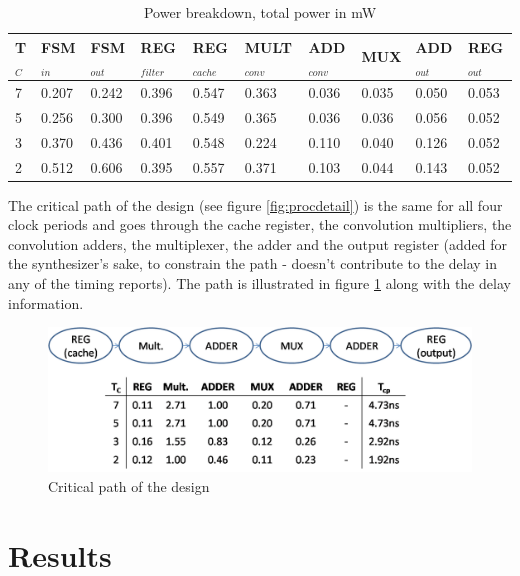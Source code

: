 \documentclass[11pt,a4paper]{article}
\begin{document}
\begin{table}
	\caption{Power breakdown, total power in mW}
	\begin{center}
		\begin{tabular}{|p{0.4cm}|p{1.15cm}|p{1.25cm}|p{1.5cm}|p{1.55cm}|p{1.75cm}|p{1.45cm}|p{1cm}|p{1.3cm}|p{1.25cm}|} \hline
			\textbf{T}$_{C}$ & \textbf{FSM}$_{in}$ & \textbf{FSM}$_{out}$ & \textbf{REG}$_{filter}$ & \textbf{REG}$_{cache}$ & \textbf{MULT}$_{conv}$ & \textbf{ADD}$_{conv}$ & \textbf{MUX} & \textbf{ADD}$_{out}$ & \textbf{REG}$_{out}$ \\ \hline
			7 & 0.207 & 0.242 & 0.396 & 0.547 & 0.363 & 0.036 & 0.035 & 0.050 & 0.053 \\ \hline
			5 & 0.256 & 0.300 & 0.396 & 0.549 & 0.365 & 0.036 & 0.036 & 0.056 & 0.052 \\ \hline 
			3 & 0.370 & 0.436 & 0.401 & 0.548 & 0.224 & 0.110 & 0.040 & 0.126 & 0.052 \\ \hline
			2 & 0.512 & 0.606 & 0.395 & 0.557 & 0.371 & 0.103 & 0.044 & 0.143 & 0.052 \\ \hline
		\end{tabular}
	\end{center}
	\label{tab:broken}
\end{table}

The critical path of the design (see figure \ref{fig:procdetail}) is the same for all four clock periods and goes through the cache register, the convolution multipliers, the convolution adders, the multiplexer, the adder and the output register (added for the synthesizer's sake, to constrain the path - doesn't contribute to the delay in any of the timing reports). The path is illustrated in figure \ref{fig:critical} along with the delay information.

\begin{figure}[h]
	\centering
		\includegraphics[width=6in]{./images/criticalpath.PNG}
	\caption{Critical path of the design}	\label{fig:critical}
\end{figure}

\FloatBarrier
\section{Results}
\label{sec:results}
\end{document}
